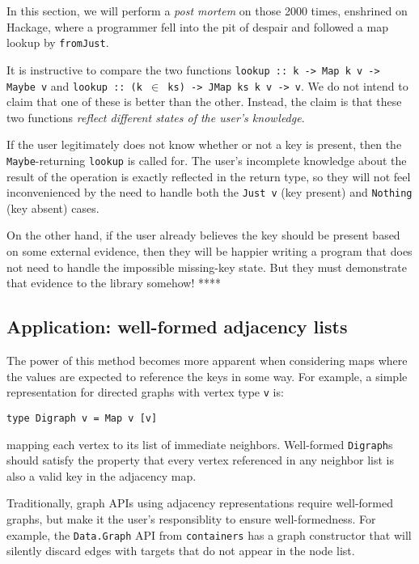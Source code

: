 \documentclass[format=sigplan, review=false, screen=true]{acmart}
\begin{document}
In this section, we will perform a \textit{post mortem} on those
2000 times, enshrined on Hackage, where a programmer fell into
the pit of despair and followed a map lookup by \texttt{fromJust}.

It is instructive to compare the two functions \texttt{lookup :: k -> Map k v -> Maybe v}
and \texttt{lookup :: (k $\in$ ks) -> JMap ks k v -> v}. We do not intend to claim that
one of these is better than the other. Instead, the claim is that these two functions
\emph{reflect different states of the user's knowledge}.

If the user legitimately does not know whether or not a key is present, then the
\texttt{Maybe}-returning \texttt{lookup} is called for. The user's incomplete knowledge
about the result of the operation is exactly reflected in the return type, so they will
not feel inconvenienced by the need to handle both the \texttt{Just v} (key present)
and \texttt{Nothing} (key absent) cases.

On the other hand, if the user already believes the key should be present based on some
external evidence, then they will be happier writing a program that does not need to handle
the impossible missing-key state. But they must demonstrate that evidence to the library
somehow!  ****

\subsection{Application: well-formed adjacency lists}

The power of this method becomes more apparent when considering maps where
the values are expected to reference the keys in some way. For example, a
simple representation for directed graphs with vertex type \texttt{v} is:
\begin{verbatim}
type Digraph v = Map v [v]
\end{verbatim}
mapping each vertex to its list of immediate neighbors. Well-formed \texttt{Digraph}s
should satisfy the property that every vertex referenced in any neighbor list is also
a valid key in the adjacency map.

Traditionally, graph APIs using adjacency representations require well-formed
graphs, but make it the user's responsiblity to ensure well-formedness. For example,
the \texttt{Data.Graph} API from \texttt{containers} has a graph constructor that
will silently discard edges with targets that do not appear in the node list.
\end{document}
